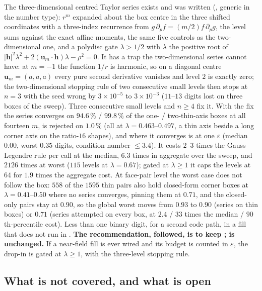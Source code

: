 The three-dimensional centred Taylor series exists and was written (,
generic in the number type): $r^m$ expanded about the box centre in the three shifted
coordinates with a three-index recurrence from $g\,\partial_pf = (m/2)f\,\partial_pg$, the
level sums against the exact affine moments, the same five controls as the two-dimensional
one, and a polydisc gate $\lambda>1/2$ with $\lambda$ the positive root of
$|\mathbf{h}|^2\lambda^2+2(\mathbf{u}_m\!\cdot\!\mathbf{h})\lambda-\rho^2 = 0$. It has a trap
the two-dimensional series cannot have: at $m = -1$ the function $1/r$ is harmonic, so on a
diagonal centre $\mathbf{u}_m = (a,a,a)$ every pure second derivative vanishes and level $2$
is exactly zero; the two-dimensional stopping rule of two consecutive small levels then stops
at $n = 3$ with the seed wrong by $3\times10^{-5}$ to $3\times10^{-3}$ ($11$--$13$ digits
lost on three boxes of the sweep). Three consecutive small levels and $n\ge4$ fix it. With
the fix the series converges on $94.6\,\%$ / $99.8\,\%$ of the one- / two-thin-axis boxes at
all fourteen $m$, is rejected on $1.0\,\%$ (all at $\lambda = 0.463$--$0.497$, a thin axis
beside a long corner axis on the ratio-$16$ shapes), and where it converges is at one
$\varepsilon$ (median $0.00$, worst $0.35$ digits, condition number $\le3.4$). It costs
$2$--$3$ times the Gauss--Legendre rule per call at the median, $6.3$ times in aggregate over
the sweep, and $2126$ times at worst ($115$ levels at $\lambda = 0.67$); gated at
$\lambda\ge1$ it caps the levels at $64$ for $1.9$ times the aggregate cost. At face-pair
level the worst case does not follow the box: $558$ of the $1595$ thin pairs also hold
closed-form corner boxes at $\lambda = 0.41$--$0.50$ where no series converges, pinning them
at $0.71$, and the closed-only pairs stay at $0.90$, so the global worst moves from $0.93$
to $0.90$ (series on thin boxes) or $0.71$ (series attempted on every box, at $2.4$ / $33$
times the median / $90$th-percentile cost). Less than one binary digit, for a second code
path, in a fill that does not run in . \textbf{The recommendation, followed,
is to keep ;  is unchanged.} If a  near-field
fill is ever wired and its budget is counted in $\varepsilon$, the drop-in is
 gated at $\lambda\ge1$, with the three-level stopping
rule.

\subsection{What is not covered, and what is open}
\label{sec:xs:open}

